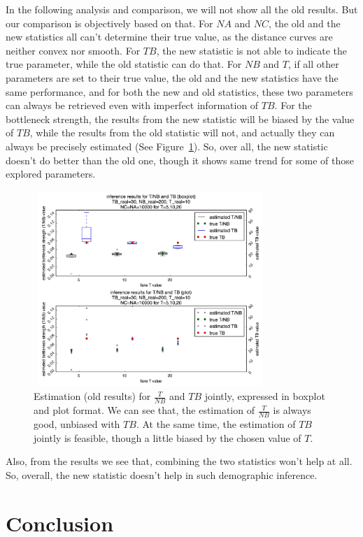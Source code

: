 \documentclass{bioinfo}
\begin{document}
In the following analysis and comparison, we will not show all the old results. But our comparison is objectively based on that. For $NA$ and $NC$, the old and the new statistics all can't determine their true value, as the distance curves are neither convex nor smooth. For $TB$, the new statistic is not able to indicate the true parameter, while the old statistic can do that. For $NB$ and $T$, if all other parameters are set to their true value, the old and the new statistics have the same performance, and for both the new and old statistics, these two parameters can always be retrieved even with imperfect information of $TB$. For the bottleneck strength, the results from the new statistic will be biased by the value of $TB$, while the results from the old statistic will not, and actually they can always be precisely estimated (See Figure~\ref{fig:TNBTB_old}). So, over all, the new statistic doesn't do better than the old one, though it shows same trend for some of those explored parameters.

\begin{figure}[h]
\centerline{\includegraphics[width=250pt, height=210pt]{TNBTB_old.jpg}}
\caption{Estimation (old results) for $\frac{T}{NB}$ and $TB$ jointly, expressed in boxplot and plot format. We can see that, the estimation of $\frac{T}{NB}$ is always good, unbiased with $TB$. At the same time, the estimation of $TB$ jointly is feasible, though a little biased by the chosen value of $T$.}\label{fig:TNBTB_old}
\end{figure}

Also, from the results we see that, combining the two statistics won't help at all. So, overall, the new statistic doesn't help in such demographic inference.



\section{Conclusion}
\end{document}
